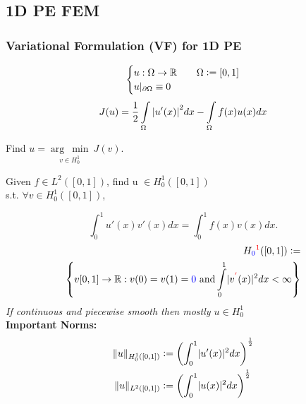 \subsection{1D PE FEM}
    \subsubsection{Variational Formulation (VF) for 1D PE}
        \vspace{-0.5em}
        $$
            \begin{cases}
                u: \Omega \to \mathbb{R} &\quad \Omega \vcentcolon= [0,1]\\
                u\rvert_{\partial \Omega} \equiv 0 
            \end{cases}
        $$
        $$
            J(u) = \frac{1}{2} \int\limits_\Omega \abs{u'(x)}^2 dx - \int\limits_\Omega f(x) u(x) dx
        $$
        \begin{center}
            Find $u = \underset{v \in H_0^1}{\arg\ \min} \ J(v)$.
        \end{center}
            \begin{center}
                Given $f \in L^2([0,1])$, find u $\in H_0^1([0,1])$\\[0.4em]
                s.t. $\forall v \in H_0^1([0,1])$,
            \end{center}
            $$
                \int_0^1 u'(x) v'(x) dx = \int_0^1 f(x) v(x) dx.
            $$
            \begin{align*}
                H_{\color{blue}0}^{\color{red}1}([0,1]) \vcentcolon= \\
                \left\{ v[0,1] \to \mathbb{R}: v(0)=v(1)={\color{blue}0} \textrm{ and}  \int\limits_0^1 \lvert v^{\color{red}'}(x)\rvert^2 dx < \infty \right\}
            \end{align*}
            \textit{If continuous and piecewise smooth then mostly $u \in H_0^1$}\\[1em]
            \textbf{Important Norms:}
            \begin{align*}
                \lVert u \rVert _{H_0^1([0,1])} &\vcentcolon= \left( \int_0^1 \lvert u'(x) \rvert^2 dx \right)^{\frac{1}{2}}\\
                \lVert u \rVert _{L^2([0,1])}   &\vcentcolon= \left( \int_0^1 \lvert u(x) \rvert^2 dx \right)^{\frac{1}{2}}
            \end{align*}
